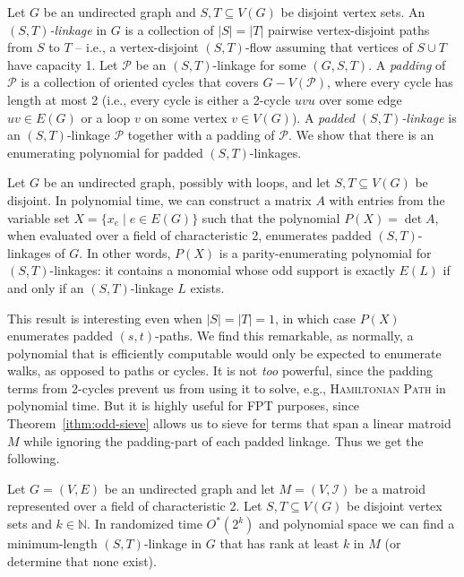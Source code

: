 \documentclass{theoretics}
\newcommand{\N}{\ensuremath{\mathbb N}\xspace}
\newcommand{\cI}{\ensuremath{\mathcal I}\xspace}
\newcommand{\cP}{\ensuremath{\mathcal P}\xspace}
\begin{document}
Let $G$ be an undirected graph and $S, T \subseteq V(G)$ be disjoint
vertex sets. An \emph{$(S,T)$-linkage} in $G$ is a collection of
$|S|=|T|$ pairwise vertex-disjoint paths from $S$ to $T$ -- i.e., a
vertex-disjoint $(S,T)$-flow assuming that vertices of $S \cup T$ 
have capacity 1. Let $\cP$ be an $(S,T)$-linkage for some $(G, S, T)$.
A \emph{padding} of $\cP$ is a collection of oriented cycles that
covers $G-V(\cP)$, where every cycle has length at most 2 (i.e., every
cycle is either a 2-cycle $uvu$ over some edge $uv \in E(G)$
or a loop $v$ on some vertex $v \in V(G)$). 
A \emph{padded $(S,T)$-linkage} is an $(S,T)$-linkage $\cP$ together with a padding of $\cP$.
We show that there is an enumerating polynomial for padded $(S,T)$-linkages. 

\begin{lemma}
  Let $G$ be an undirected graph, possibly with loops,
  and let $S, T \subseteq V(G)$ be disjoint.
  In polynomial time, we can construct a matrix $A$ with entries from the variable set $X= \{x_e \mid e \in E(G) \}$ such that the polynomial $P(X)=\det A$, when evaluated over a field of characteristic 2, enumerates padded $(S,T)$-linkages of $G$.
  In other words, $P(X)$ is a parity-enumerating polynomial for $(S,T)$-linkages: it contains a monomial whose odd support is exactly $E(L)$ if and only if an $(S,T)$-linkage $L$ exists.
\end{lemma}

This result is interesting even when $|S|=|T|=1$, in which case $P(X)$
enumerates padded $(s,t)$-paths. We find this remarkable, as normally,
a polynomial that is efficiently computable would only be expected to
enumerate walks, as opposed to paths or cycles. It is not \emph{too}
powerful, since the padding terms from 2-cycles prevent us from 
using it to solve, e.g., \textsc{Hamiltonian Path} in polynomial time.
But it is highly useful for FPT purposes, since Theorem~\ref{ithm:odd-sieve}
allows us to sieve for terms that span a linear matroid $M$ while ignoring the
padding-part of each padded linkage. Thus we get the following.

\begin{theorem} \label{ithm:linkage}
  Let $G=(V,E)$ be an undirected graph and
  let $M=(V,\cI)$ be a matroid represented over a field of characteristic 2.
  Let $S, T \subseteq V(G)$ be disjoint vertex sets and $k \in \N$.
  In randomized time $O^*(2^k)$ and polynomial space we can find a
  minimum-length $(S,T)$-linkage in $G$ that has rank at least $k$ in
  $M$ (or determine that none exist).  
\end{theorem}
\end{document}

